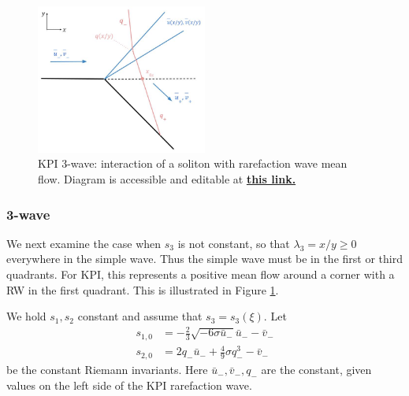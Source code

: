 \documentclass[12pt]{article}
\numberwithin{equation}{section}
\begin{document}
\begin{figure}
    \centering
    \includegraphics[width = 0.5\textwidth]{figures/KPI RW soliton interaction.jpg}
    \caption{KPI 3-wave: interaction of a soliton with rarefaction wave mean flow. Diagram is accessible and editable at \href{https://docs.google.com/drawings/d/1qAcWeN46pt7tIWzvV4KJ7gigHyIDA4orVNvBKdzfUPw/edit}{\bf this link.}}
    \label{fig:KPI 3-wave}
\end{figure}

\subsubsection{3-wave}
We next examine the case when $s_3$ is not constant, so that $\lambda_3 = x/y \geq 0$ everywhere in the simple wave. Thus the simple wave must be in the first or third quadrants. For KPI, this represents a positive mean flow around a corner with a RW in the first quadrant. This is illustrated in Figure \ref{fig:KPI 3-wave}.

We hold $s_1,s_2$ constant and assume that $s_3 = s_3(\xi)$. Let 
\begin{align}
    s_{1,0} &= -\frac{2}{3}\sqrt{-6\sigma\bar u_-}\bar u_- - \bar v_- \\
    s_{2,0} &= 2q_-\bar u_- + \frac{4}{9}\sigma q_-^3 - \bar v_- 
\end{align}
be the constant Riemann invariants. Here $\bar u_-, \bar v_-, q_-$ are the constant, given values on the left side of the KPI rarefaction wave.
\end{document}
